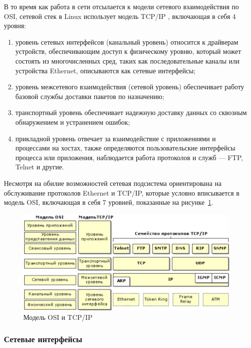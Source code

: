 В то время как работа в сети отсылается к модели сетевого взаимодействия по OSI, сетевой стек в Linux использует модель TCP/IP \cite{tcpip_craig, tcpip_lora}, включающая в себя 4 уровня:
\begin{enumerate}
	\item уровень сетевых интерфейсов (канальный уровень) относится к драйверам устройств, обеспечивающим доступ к физическому уровню, который может состоять из многочисленных сред, таких как последовательные каналы или устройства Ethernet, описываются как сетевые интерфейсы;
	\item уровень межсетевого взаимодействия (сетевой уровень) обеспечивает работу базовой
	службы доставки пакетов по назначению;
	\item транспортный уровень обеспечивает надежную доставку данных со сквозным обнаружением и устранением ошибок;
	\item прикладной уровень отвечает за взаимодействие с приложениями и процессами на хостах, также определяются пользовательские интерфейсы процесса или приложения, наблюдается работа протоколов и служб --- FTP, Telnet и другие. 
\end{enumerate}

Несмотря на обилие возможностей сетевая подсистема ориентирована на обслуживание протоколов Ethernet и TCP/IP, которые условно вписывается в модель OSI, включающая в себя 7 уровней, показанные на рисунке~\ref{img:protocol}.

\begin{figure}[h!]
	\centering
	\includegraphics[height=0.3\textheight]{img/protocol}
	\caption{Модель OSI и TCP/IP}
	\label{img:protocol}
\end{figure}

\subsubsection{Сетевые интерфейсы}

